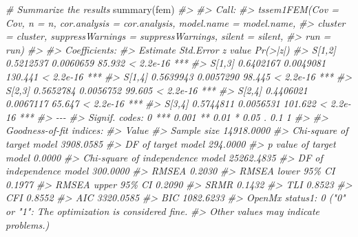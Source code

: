 \documentclass[
]{book}
\newenvironment{Shaded}{\begin{snugshade}}{\end{snugshade}}
\newcommand{\CommentTok}[1]{\textcolor[rgb]{0.56,0.35,0.01}{\textit{#1}}}
\newcommand{\FunctionTok}[1]{\textcolor[rgb]{0.00,0.00,0.00}{#1}}
\newcommand{\NormalTok}[1]{#1}
\begin{document}
\begin{Shaded}
\begin{Highlighting}[]
\CommentTok{\# Summarize the results}
\FunctionTok{summary}\NormalTok{(fem)}
\CommentTok{\#\textgreater{} }
\CommentTok{\#\textgreater{} Call:}
\CommentTok{\#\textgreater{} tssem1FEM(Cov = Cov, n = n, cor.analysis = cor.analysis, model.name = model.name, }
\CommentTok{\#\textgreater{}     cluster = cluster, suppressWarnings = suppressWarnings, silent = silent, }
\CommentTok{\#\textgreater{}     run = run)}
\CommentTok{\#\textgreater{} }
\CommentTok{\#\textgreater{} Coefficients:}
\CommentTok{\#\textgreater{}         Estimate Std.Error z value  Pr(\textgreater{}|z|)    }
\CommentTok{\#\textgreater{} S[1,2] 0.5212537 0.0060659  85.932 \textless{} 2.2e{-}16 ***}
\CommentTok{\#\textgreater{} S[1,3] 0.6402167 0.0049081 130.441 \textless{} 2.2e{-}16 ***}
\CommentTok{\#\textgreater{} S[1,4] 0.5639943 0.0057290  98.445 \textless{} 2.2e{-}16 ***}
\CommentTok{\#\textgreater{} S[2,3] 0.5652784 0.0056752  99.605 \textless{} 2.2e{-}16 ***}
\CommentTok{\#\textgreater{} S[2,4] 0.4406021 0.0067117  65.647 \textless{} 2.2e{-}16 ***}
\CommentTok{\#\textgreater{} S[3,4] 0.5744811 0.0056531 101.622 \textless{} 2.2e{-}16 ***}
\CommentTok{\#\textgreater{} {-}{-}{-}}
\CommentTok{\#\textgreater{} Signif. codes:  0 \textquotesingle{}***\textquotesingle{} 0.001 \textquotesingle{}**\textquotesingle{} 0.01 \textquotesingle{}*\textquotesingle{} 0.05 \textquotesingle{}.\textquotesingle{} 0.1 \textquotesingle{} \textquotesingle{} 1}
\CommentTok{\#\textgreater{} }
\CommentTok{\#\textgreater{} Goodness{-}of{-}fit indices:}
\CommentTok{\#\textgreater{}                                       Value}
\CommentTok{\#\textgreater{} Sample size                      14918.0000}
\CommentTok{\#\textgreater{} Chi{-}square of target model        3908.0585}
\CommentTok{\#\textgreater{} DF of target model                 294.0000}
\CommentTok{\#\textgreater{} p value of target model              0.0000}
\CommentTok{\#\textgreater{} Chi{-}square of independence model 25262.4835}
\CommentTok{\#\textgreater{} DF of independence model           300.0000}
\CommentTok{\#\textgreater{} RMSEA                                0.2030}
\CommentTok{\#\textgreater{} RMSEA lower 95\% CI                   0.1977}
\CommentTok{\#\textgreater{} RMSEA upper 95\% CI                   0.2090}
\CommentTok{\#\textgreater{} SRMR                                 0.1432}
\CommentTok{\#\textgreater{} TLI                                  0.8523}
\CommentTok{\#\textgreater{} CFI                                  0.8552}
\CommentTok{\#\textgreater{} AIC                               3320.0585}
\CommentTok{\#\textgreater{} BIC                               1082.6233}
\CommentTok{\#\textgreater{} OpenMx status1: 0 ("0" or "1": The optimization is considered fine.}
\CommentTok{\#\textgreater{} Other values may indicate problems.)}


\end{Highlighting}
\end{Shaded}
\end{document}
